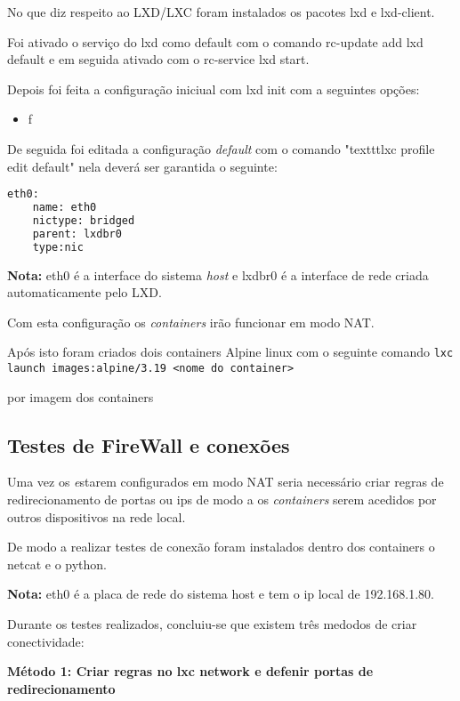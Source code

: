 No que diz respeito ao LXD/LXC foram instalados os pacotes lxd e lxd-client.


Foi ativado o serviço do lxd como default com o comando rc-update add lxd default
e em seguida ativado com o rc-service lxd start.

Depois foi feita a configuração iniciual com lxd init com a seguintes opções:

\begin{itemize}
    \item f
\end{itemize}

De seguida foi editada a configuração \textit{default} com o 
comando "texttt{lxc profile edit default}" nela deverá ser garantida o
seguinte:

\begin{lstlisting}[language=csh, caption={edição do perfil padrão}]
  eth0:
    name: eth0
    nictype: bridged
    parent: lxdbr0
    type:nic

\end{lstlisting}

\textbf{Nota:} eth0 é a interface do sistema \textit{host} e lxdbr0 é a interface
de rede criada automaticamente pelo LXD.

Com esta configuração os \textit{containers} irão funcionar em modo NAT.


Após isto foram criados dois containers Alpine linux com o seguinte 
comando \texttt{lxc launch images:alpine/3.19 <nome do container>}

por imagem dos containers

\subsection{Testes de FireWall e conexões}

Uma vez os \textit estarem configurados em modo NAT seria necessário criar regras 
de redirecionamento de portas ou ips de modo a os \textit{containers} serem acedidos
por outros dispositivos na rede local.


De modo a realizar testes de conexão foram instalados dentro dos containers
o netcat e o python.

\textbf{Nota:} eth0 é a placa de rede do sistema host e tem o ip local de 192.168.1.80.


Durante os testes realizados, concluiu-se que existem três medodos de criar conectividade:

\textbf{Método 1: Criar regras no lxc network e defenir portas de redirecionamento}

